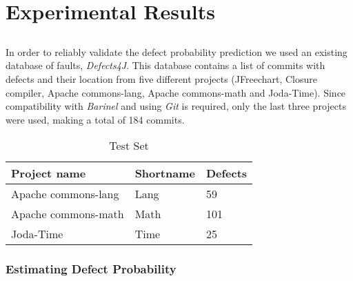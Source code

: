 \chapter{Experimental Results} \label{chap:exp-res}

\section*{}

In order to reliably validate the defect probability prediction we used an existing database of faults, \emph{Defects4J}.
This database contains a list of commits with defects and their location from five different projects (JFreechart, Closure compiler, Apache commons-lang, Apache commons-math and Joda-Time).
Since compatibility with \emph{Barinel} and using \emph{Git} is required, only the last three projects were used, making a total of 184 commits.
%
\begin{table}[H]
	\centering
	\begin{tabular}{|l|l|l|}
	\hline
	\textbf{Project name} & \textbf{Shortname} & \textbf{Defects} \\ \hline
	Apache commons-lang   & Lang               & 59               \\ \hline
	Apache commons-math   & Math               & 101              \\ \hline
	Joda-Time             & Time               & 25               \\ \hline
	\end{tabular}
	\caption{Test Set}
	\label{test-set}
\end{table}

\subsection{Estimating Defect Probability}

